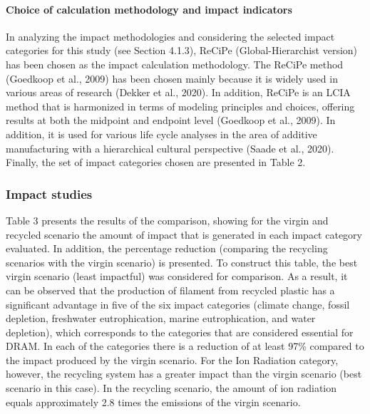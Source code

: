 \documentclass[]{elsarticle} %
\begin{document}
\hypertarget{choice-of-calculation-methodology-and-impact-indicators}{%
\paragraph{Choice of calculation methodology and impact indicators}\label{choice-of-calculation-methodology-and-impact-indicators}}

In analyzing the impact methodologies and considering the selected impact categories for this study (see Section 4.1.3), ReCiPe (Global-Hierarchist version) has been chosen as the impact calculation methodology. The ReCiPe method (Goedkoop et al., 2009) has been chosen mainly because it is widely used in various areas of research (Dekker et al., 2020). In addition, ReCiPe is an LCIA method that is harmonized in terms of modeling principles and choices, offering results at both the midpoint and endpoint level (Goedkoop et al., 2009). In addition, it is used for various life cycle analyses in the area of additive manufacturing with a hierarchical cultural perspective (Saade et al., 2020).
Finally, the set of impact categories chosen are presented in Table 2.

\hypertarget{impact-studies}{%
\subsubsection{Impact studies}\label{impact-studies}}

Table 3 presents the results of the comparison, showing for the virgin and recycled scenario the amount of impact that is generated in each impact category evaluated. In addition, the percentage reduction (comparing the recycling scenarios with the virgin scenario) is presented. To construct this table, the best virgin scenario (least impactful) was considered for comparison. As a result, it can be observed that the production of filament from recycled plastic has a significant advantage in five of the six impact categories (climate change, fossil depletion, freshwater eutrophication, marine eutrophication, and water depletion), which corresponds to the categories that are considered essential for DRAM. In each of the categories there is a reduction of at least 97\% compared to the impact produced by the virgin scenario. For the Ion Radiation category, however, the recycling system has a greater impact than the virgin scenario (best scenario in this case). In the recycling scenario, the amount of ion radiation equals approximately 2.8 times the emissions of the virgin scenario.
\end{document}
